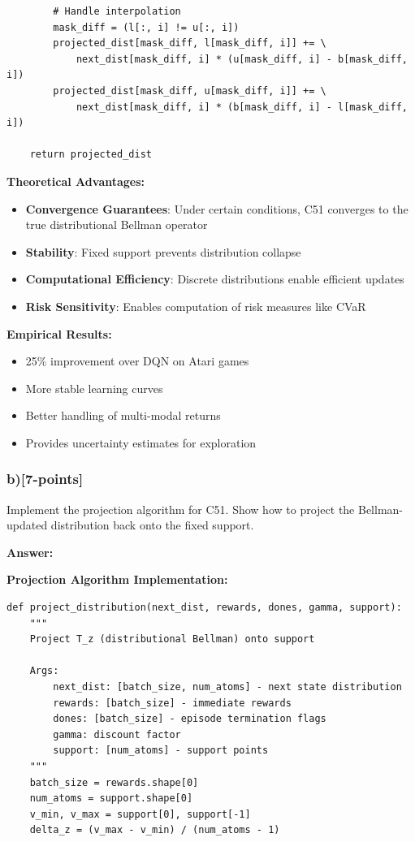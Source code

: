 \documentclass[12pt]{article}
\begin{document}
{{\begin{verbatim}
        # Handle interpolation
        mask_diff = (l[:, i] != u[:, i])
        projected_dist[mask_diff, l[mask_diff, i]] += \
            next_dist[mask_diff, i] * (u[mask_diff, i] - b[mask_diff, i])
        projected_dist[mask_diff, u[mask_diff, i]] += \
            next_dist[mask_diff, i] * (b[mask_diff, i] - l[mask_diff, i])
    
    return projected_dist
\end{verbatim}

\textbf{Theoretical Advantages:}
\begin{itemize}
\item \textbf{Convergence Guarantees}: Under certain conditions, C51 converges to the true distributional Bellman operator
\item \textbf{Stability}: Fixed support prevents distribution collapse
\item \textbf{Computational Efficiency}: Discrete distributions enable efficient updates
\item \textbf{Risk Sensitivity}: Enables computation of risk measures like CVaR
\end{itemize}

\textbf{Empirical Results:}
\begin{itemize}
\item 25\% improvement over DQN on Atari games
\item More stable learning curves
\item Better handling of multi-modal returns
\item Provides uncertainty estimates for exploration
\end{itemize}

\subsubsection{b)[7-points]} Implement the projection algorithm for C51. Show how to project the Bellman-updated distribution back onto the fixed support.

\textbf{Answer:}

\textbf{Projection Algorithm Implementation:}

\begin{verbatim}
def project_distribution(next_dist, rewards, dones, gamma, support):
    """
    Project T_z (distributional Bellman) onto support
    
    Args:
        next_dist: [batch_size, num_atoms] - next state distribution
        rewards: [batch_size] - immediate rewards
        dones: [batch_size] - episode termination flags
        gamma: discount factor
        support: [num_atoms] - support points
    """
    batch_size = rewards.shape[0]
    num_atoms = support.shape[0]
    v_min, v_max = support[0], support[-1]
    delta_z = (v_max - v_min) / (num_atoms - 1)
    

\end{verbatim}}}
\end{document}
